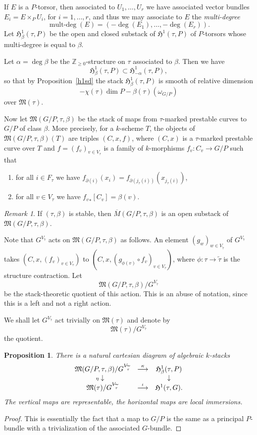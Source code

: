 \documentclass[11pt]{article}
\newcommand{\HH}{\mathfrak{H}}
\newcommand{\MM}{\mathfrak{M}}
\newcommand{\comdia}[9]{
\begin{array}{ccc}
#1 & \stackrel{#2}{\longrightarrow} & #3 \\
\ldiag{#4} & #5 & \rdiag{#6} \\
#7 & \stackrel{#8}{\longrightarrow} & #9
\end{array}}
\newcommand{\comp}{\mathbin{{\scriptstyle\circ}}}
\newcommand{\del}{\partial}
\newcommand{\ldiag}[1]{\makebox[0cm]{\({\scriptstyle#1}\downarrow\phantom{\scriptstyle#1}\)}}
\newcommand{\lst}{_{\ast}}
\DeclareMathOperator{\multdeg}{mult-deg}
\newcommand{\ol}{\overline}
\newcommand{\rdiag}[1]{\makebox[0cm]{\(\phantom{\scriptstyle#1}\downarrow{\scriptstyle#1}\)}}
\renewcommand{\t}{_{\tau}}
\renewcommand{\tilde}{\widetilde}
\newcommand{\zz}{\mathbb{Z}}
\theoremstyle{plain}
\newtheorem{prop}{Proposition}
\theoremstyle{remark}
\newtheorem*{rmk}{Remark}
\newenvironment{pf}{\begin{proof}}{\end{proof}}
\theoremstyle{plain}
\theoremstyle{definition}
\theoremstyle{remark}
\begin{document}
If \(E\) is a \(P\)-torsor, then associated to \(U_1,\ldots,U_r\) we have
associated vector bundles \(E_i=E\times_PU_i\), for \(i=1,\ldots,r\), and
thus we may associate to \(E\) the {\em multi-degree }
\[
\multdeg(E)=(-\deg(E_1),\ldots,-\deg(E_r)).
\]
Let \(\HH^1_{\beta}(\tau,P)\) be the open and closed
substack of \(\HH^1(\tau,P)\) of \(P\)-torsors whose
multi-degree is equal to \(\beta\).

Let \(\alpha=\deg\beta\) be the \(\zz_{\geq0}\)-structure on \(\tau\)
associated to \(\beta\). Then we have
\[
\HH^1_{\beta}(\tau,P)
\subset\HH^1_{-\alpha}(\tau,P),
\]
so that by Proposition~\ref{h1sd} the stack
\(\HH^1_{\beta}(\tau,P)\) is smooth of relative dimension
\[
-\chi(\tau)\dim P-\beta(\tau)(\omega_{G/P})
\]
over \(\MM(\tau)\).

Now let \(\MM(G/P,\tau,\beta)\) be the stack of maps from \(\tau\)-marked
prestable curves to \(G/P\) of class \(\beta\). More precisely, for a
\(k\)-scheme \(T\), the objects of \(\MM(G/P,\tau,\beta)(T)\) are triples
\((C,x,f)\), where \((C,x)\) is a \(\tau\)-marked prestable curve over \(T\)
and \(f=(f_v)_{v\in V\t}\) is a family of \(k\)-morphisms
\(f_v:C_v\rightarrow G/P\) such that
\begin{enumerate}
\item for all \(i\in F\t\) we have
\(f_{\del(i)}(x_i)=f_{\del(j\t(i))}(x_{j\t(i)})\),
\item for all \(v\in V\t\) we have \({f_v}\lst[C_v]=\beta(v)\).
\end{enumerate}

\begin{rmk}
If \((\tau,\beta)\) is stable, then \(\ol{M}(G/P,\tau,\beta)\) is an open
substack of \(\MM(G/P,\tau,\beta)\).
\end{rmk}

Note that \(G^{V_{\tilde{\tau}}}\) acts on \(\MM(G/P,\tau,\beta)\) as
follows. An element \((g_w)_{w\in V_{\tilde{\tau}}}\) of
\(G^{V_{\tilde{\tau}}}\) takes \((C,x,(f_v)_{v\in V\t})\) to
\((C,x,(g_{\phi(v)}\comp f_v)_{v\in V\t})\), where
\(\phi:\tau\rightarrow\tilde{\tau}\) is the structure contraction.  Let
\[
\MM(G/P,\tau,\beta)/G^{V_{\tilde{\tau}}}
\]
be the
stack-theoretic quotient of this action. This is an abuse of notation,
since this is a left and not a right action.

We shall let \(G^{V_{\tilde{\tau}}}\) act trivially on \(\MM(\tau)\)
and denote by
\[
\MM(\tau)/G^{V_{\tilde{\tau}}}
\]
the quotient.

\begin{prop} \label{mcd}
There is a natural cartesian diagram of algebraic \(k\)-stacks
\[
\comdia{\MM(G/P,\tau,\beta)/G^{V_{\tilde{\tau}}}}{\kappa
}{\HH^1_{\beta}(\tau,P)}{\eta}{
}{}{\MM(\tau)/G^{V_{\tilde{\tau}}}}{
\iota}{\HH^1(\tau,G).}
\]
The vertical maps are
representable, the horizontal maps are local immersions.
\end{prop}
\begin{pf}
This is essentially the fact that a map to \(G/P\) is the same as a
principal \(P\)-bundle with a trivialization of the associated
\(G\)-bundle.
\end{pf}
\end{document}

